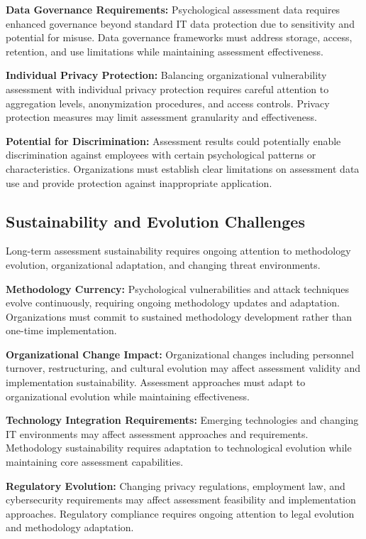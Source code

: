 \documentclass[10pt, twocolumn]{article}
\begin{document}
\textbf{Data Governance Requirements:} Psychological assessment data requires enhanced governance beyond standard IT data protection due to sensitivity and potential for misuse. Data governance frameworks must address storage, access, retention, and use limitations while maintaining assessment effectiveness.

\textbf{Individual Privacy Protection:} Balancing organizational vulnerability assessment with individual privacy protection requires careful attention to aggregation levels, anonymization procedures, and access controls. Privacy protection measures may limit assessment granularity and effectiveness.

\textbf{Potential for Discrimination:} Assessment results could potentially enable discrimination against employees with certain psychological patterns or characteristics. Organizations must establish clear limitations on assessment data use and provide protection against inappropriate application.

\subsection{Sustainability and Evolution Challenges}

Long-term assessment sustainability requires ongoing attention to methodology evolution, organizational adaptation, and changing threat environments.

\textbf{Methodology Currency:} Psychological vulnerabilities and attack techniques evolve continuously, requiring ongoing methodology updates and adaptation. Organizations must commit to sustained methodology development rather than one-time implementation.

\textbf{Organizational Change Impact:} Organizational changes including personnel turnover, restructuring, and cultural evolution may affect assessment validity and implementation sustainability. Assessment approaches must adapt to organizational evolution while maintaining effectiveness.

\textbf{Technology Integration Requirements:} Emerging technologies and changing IT environments may affect assessment approaches and requirements. Methodology sustainability requires adaptation to technological evolution while maintaining core assessment capabilities.

\textbf{Regulatory Evolution:} Changing privacy regulations, employment law, and cybersecurity requirements may affect assessment feasibility and implementation approaches. Regulatory compliance requires ongoing attention to legal evolution and methodology adaptation.
\end{document}
